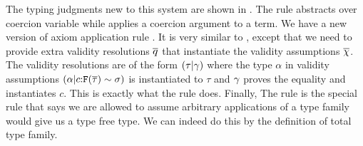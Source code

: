 \documentclass[format=acmsmall,manuscript,review,screen,nonacm,margin=1in,11pt]{acmart}
\begin{document}
\newcommand\QCoVar{
  \ib{\irule[\trule{co-var}]
    {c\co\Preds \in \VEnv};
    {\Typing {\GEnv;\VEnv} {c} \Preds}}
}


The typing judgments new to this system are shown in .
The rule  abstracts over coercion variable while  applies a coercion
argument to a term. We have a new version of axiom application rule .
It is very similar to , except that we need
to provide extra validity resolutions $\overline{q}$ that instantiate the validity assumptions $\overline{\chi}$.
The validity resolutions are of the form $(\tau|\gamma)$ where the type $\alpha$
in validity assumptions $(\alpha|c{:}\texttt{F}(\overline{\tau})\mathrel{\sim}\sigma)$ is instantiated to $\tau$ and
$\gamma$ proves the equality and instantiates $c$. This is exactly what the rule  does.
Finally, The rule  is the special rule that says we are allowed to assume arbitrary applications
of a type family would give us a type free type. We can indeed do this by the definition of total type family.
\end{document}
